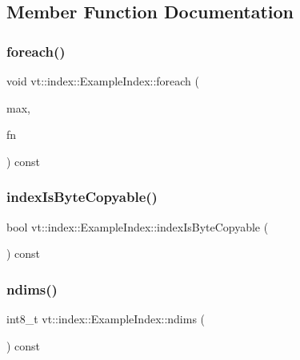 \subsection{Member Function Documentation}
\mbox{\label{structvt_1_1index_1_1_example_index_afcee93f213e381a767210e35f7746462}} 
\subsubsection{\texorpdfstring{foreach()}{foreach()}}
{\footnotesize\ttfamily void vt\+::index\+::\+Example\+Index\+::foreach (\begin{DoxyParamCaption}\item[{\hyperlink{structvt_1_1index_1_1_example_index}{Example\+Index} const \&}]{max,  }\item[{\hyperlink{structvt_1_1index_1_1_example_index_a7a5993e2e55fb1f80f59daa65ab7ead4}{Apply\+Type}}]{fn }\end{DoxyParamCaption}) const}

\mbox{\label{structvt_1_1index_1_1_example_index_a9d4dc66e352c419b6958b07c5c547fb2}} 
\subsubsection{\texorpdfstring{index\+Is\+Byte\+Copyable()}{indexIsByteCopyable()}}
{\footnotesize\ttfamily bool vt\+::index\+::\+Example\+Index\+::index\+Is\+Byte\+Copyable (\begin{DoxyParamCaption}{ }\end{DoxyParamCaption}) const}

\mbox{\label{structvt_1_1index_1_1_example_index_a95fa585991dc2fe785b63a37ba974d89}} 
\subsubsection{\texorpdfstring{ndims()}{ndims()}}
{\footnotesize\ttfamily int8\+\_\+t vt\+::index\+::\+Example\+Index\+::ndims (\begin{DoxyParamCaption}{ }\end{DoxyParamCaption}) const}

